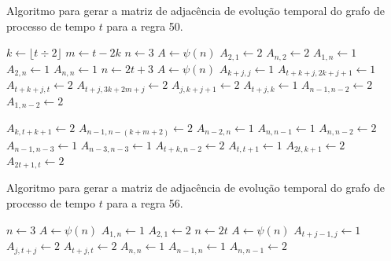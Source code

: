 \documentclass[12pt,a4paper]{article}
\begin{document}
\begin{algorithm}[H]
\caption{Algoritmo para gerar a matriz de adjacência de evolução temporal do
grafo de processo de tempo $t$ para a regra 50.}
\label{alg:r50}
\begin{algorithmic}
\STATE $k \leftarrow \lfloor t \div 2 \rfloor$
\STATE $m \leftarrow t - 2k$
    \STATE $n \leftarrow 3$
    \STATE $A \leftarrow \psi(n)$
    \STATE $A_{2,1} \leftarrow 2$
    \STATE $A_{n,2} \leftarrow 2$
    \STATE $A_{1,n} \leftarrow 1$
    \STATE $A_{2,n} \leftarrow 1$
    \STATE $A_{n,n} \leftarrow 1$
\ELSE
    \STATE $n \leftarrow 2t+3$
    \STATE $A \leftarrow \psi(n)$
        \STATE $A_{k+j,j} \leftarrow 1$
        \STATE $A_{t+k+j,2k+j+1} \leftarrow 1$
        \STATE $A_{t+k+j,t} \leftarrow 2$
    \ENDFOR
        \STATE $A_{t+j,3k+2m+j} \leftarrow 2$
        \STATE $A_{j,k+j+1} \leftarrow 2$
    \ENDFOR
        \STATE $A_{t+j,k} \leftarrow 1$
    \ENDFOR
        \STATE $A_{n-1,n-2} \leftarrow 2$
        \STATE $A_{1,n-2} \leftarrow 2$
    \ENDIF
{}
\end{algorithmic}
\end{algorithm}

\begin{algorithm}[H]
\begin{algorithmic}
        \STATE $A_{k,t+k+1} \leftarrow 2$
        \STATE $A_{n-1,n-(k+m+2)} \leftarrow 2$
    \ENDIF
    \STATE $A_{n-2,n} \leftarrow 1$
    \STATE $A_{n,n-1} \leftarrow 1$
    \STATE $A_{n,n-2} \leftarrow 2$
    \STATE $A_{n-1,n-3} \leftarrow 1$
    \STATE $A_{n-3,n-3} \leftarrow 1$
    \STATE $A_{t+k,n-2} \leftarrow 2$
    \STATE $A_{t,t+1} \leftarrow 1$
    \STATE $A_{2t,k+1} \leftarrow 2$
    \STATE $A_{2t+1,t} \leftarrow 2$
\ENDIF
\end{algorithmic}
\end{algorithm}

\begin{algorithm}[H]
\caption{Algoritmo para gerar a matriz de adjacência de evolução temporal do
grafo de processo de tempo $t$ para a regra 56.}
\label{alg:r56}
\begin{algorithmic}
    \STATE $n \leftarrow 3$
    \STATE $A \leftarrow \psi(n)$
    \STATE $A_{1,n} \leftarrow 1$
    \STATE $A_{2,1} \leftarrow 2$
\ELSE
    \STATE $n \leftarrow 2t$
    \STATE $A \leftarrow \psi(n)$
        \STATE $A_{t+j-1,j} \leftarrow 1$
        \STATE $A_{j,t+j} \leftarrow 2$
        \STATE $A_{t+j,t} \leftarrow 2$
    \ENDFOR
\ENDIF
\STATE $A_{n,n} \leftarrow 1$
\STATE $A_{n-1,n} \leftarrow 1$
\STATE $A_{n,n-1} \leftarrow 2$
\end{algorithmic}
\end{algorithm}
\end{document}
